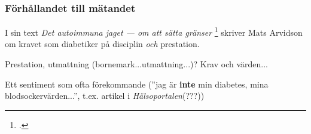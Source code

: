 \documentclass[11pt, a4paper]{article} %
\begin{document}


\subsubsection*{Förhållandet till mätandet}
I sin text \emph{Det autoimmuna jaget --- om att sätta gränser} \footcite[286]{arvidson_det_2016} skriver Mats Arvidson om kravet som diabetiker på disciplin \emph{och} prestation.

Prestation, utmattning (bornemark...utmattning...)? Krav och värden... 

Ett sentiment som ofta förekommande (''jag är \textbf{inte} min diabetes, mina blodsockervärden...'', t.ex. artikel i \emph{Hälsoportalen}(???))
\end{document}

